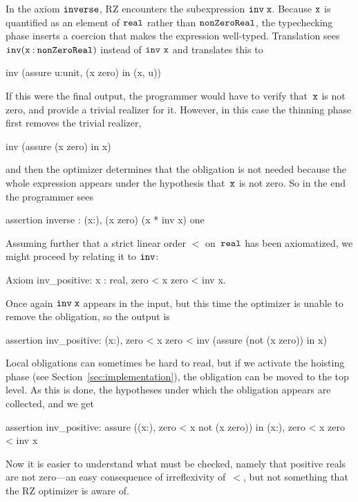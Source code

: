 In the axiom $\mathtt{inverse}$, RZ encounters the subexpression
$\mathtt{inv \;x}$. Because $\mathtt{x}$ is quantified as an element of
$\mathtt{real}$ rather than $\mathtt{nonZeroReal}$, the typechecking
phase inserts a coercion that makes the expression well-typed.
Translation sees $\mathtt{inv}(\mathtt{x} \mathbin{{:}}
\mathtt{nonZeroReal})$ instead of $\f{inv\ x}$ and translates this to
%
\begin{source}
inv (assure u:unit, \iNot (x  zero) in (x, u))
\end{source}
%
If this were the final output, the programmer would have to verify
that~$\mathtt{x}$ is not zero, and provide a trivial realizer for it. However,
in this case the thinning phase first removes the trivial realizer,
%
\iflong
\begin{source}
inv (assure \iNot (x  zero) in x)
\end{source}
\fi %
%
and then the optimizer determines that the obligation is not needed
because the whole expression appears under the hypothesis that~$\mathtt{x}$ is
not zero. So in the end the programmer sees
%
\begin{source}
assertion inverse :
  \iForall (x:),  \iNot (x  zero) \iTo (x * inv x)  one
\end{source}
%
Assuming further that a strict linear order $<$ on~$\mathtt{real}$ has
been axiomatized, we might proceed by relating it to $\mathtt{inv}$:
%
\begin{source}
Axiom inv_positive: \iForall x : real, zero < x \iTo zero < inv x.
\end{source}
%
Once again $\mathtt{inv\;x}$ appears in the input, but this time the
optimizer is unable to remove the obligation, so the output is
%
\begin{source}
assertion inv_positive: \iForall (x:),
   zero < x \iTo zero < inv (assure (not (x  zero)) in x)
\end{source}
%
Local obligations can sometimes be hard to read, but if we activate the hoisting phase
(see Section~\ref{sec:implementation}), the obligation can be moved
to the top level. As this is done, the hypotheses under which the
obligation appears are collected, and we get
%
\begin{source}
assertion inv_positive:
  assure (\iForall (x:),  zero < x \iTo not (x  zero))
    in \iForall (x:),  zero < x \iTo zero < inv x
\end{source}
%
Now it is easier to understand what must be checked, namely that
positive reals are not zero---an easy consequence of irreflexivity
of~$<$, but not something that the RZ optimizer is aware of.

